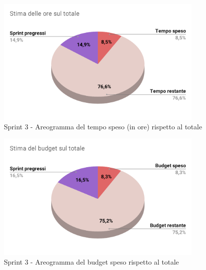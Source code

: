   \begin{figure}[H]
    \centering
    \includegraphics[width=0.90\textwidth]{assets/Consuntivo/Sprint-3/copertura_oraria.pdf}
    \caption{Sprint 3 - Areogramma del tempo speso (in ore) rispetto al totale}
  \end{figure}
  
  \begin{figure}[H]
    \centering
    \includegraphics[width=0.90\textwidth]{assets/Consuntivo/Sprint-3/budget_speso.pdf}
    \caption{Sprint 3 - Areogramma del budget speso rispetto al totale}
  \end{figure}
  

